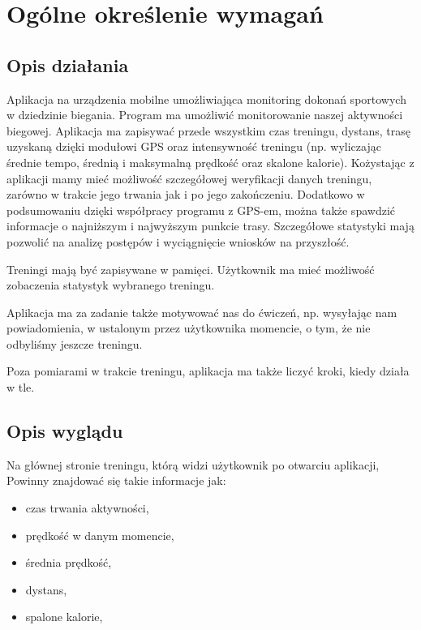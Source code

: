 	\newpage
\section{Ogólne określenie wymagań}		%




\subsection{Opis działania}  %

\hspace{0.60cm}Aplikacja na urządzenia mobilne umożliwiająca monitoring dokonań sportowych w dziedzinie biegania. Program ma umożliwić monitorowanie naszej aktywności biegowej. Aplikacja ma zapisywać przede wszystkim czas treningu, dystans, trasę uzyskaną dzięki modułowi GPS oraz intensywność treningu (np. wyliczając średnie tempo, średnią i maksymalną prędkość oraz skalone kalorie). Kożystając z aplikacji mamy mieć możliwość szczegółowej weryfikacji danych treningu, zarówno w trakcie jego trwania jak i po jego zakończeniu. Dodatkowo w podsumowaniu dzięki współpracy programu z GPS-em, można także spawdzić informacje o najniższym i najwyższym punkcie trasy. Szczegółowe statystyki mają pozwolić na analizę postępów i wyciągnięcie wniosków na przyszłość.

\hspace{0.60cm}Treningi mają być zapisywane w pamięci. Użytkownik ma mieć możliwość zobaczenia statystyk wybranego treningu.

\hspace{0.60cm}Aplikacja ma za zadanie także motywować nas do ćwiczeń, np. wysyłając nam powiadomienia, w ustalonym przez użytkownika momencie, o tym, że nie odbyliśmy jeszcze treningu.

\hspace{0.60cm}Poza pomiarami w trakcie treningu, aplikacja ma także liczyć kroki, kiedy działa w tle.






\subsection{Opis wyglądu}  %


\hspace{0.60cm}Na głównej stronie treningu, którą widzi użytkownik po otwarciu aplikacji, Powinny znajdować się takie informacje jak:
\begin{itemize}
	
	\item czas trwania aktywności,
	\item prędkość w danym momencie, 
	\item średnia prędkość,
	\item dystans, 
	\item spalone kalorie, 
\end{itemize}

